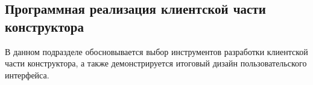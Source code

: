 
\subsection{Программная реализация клиентской части конструктора}

В данном подразделе обосновывается выбор инструментов
разработки клиентской части конструктора, а также демонстрируется
итоговый дизайн пользовательского интерфейса.



